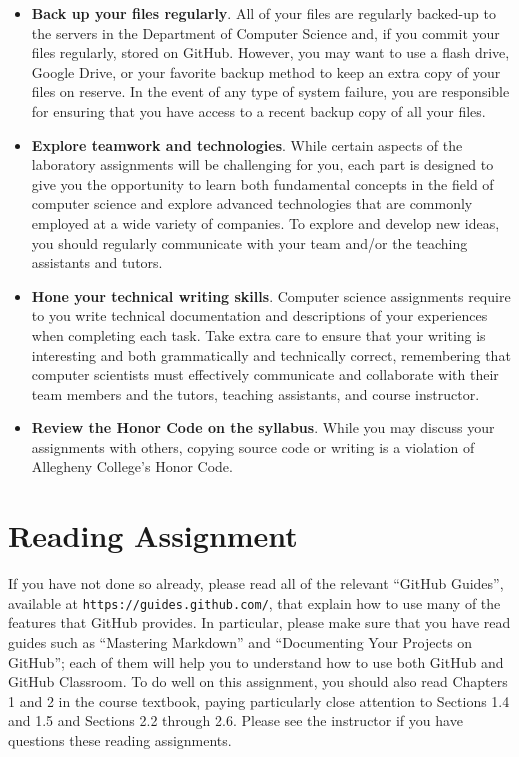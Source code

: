 \documentclass[11pt]{article}
\newcommand{\url}[1]{\lstinline{#1}}
\begin{document}
\begin{itemize}
\item {\bf Back up your files regularly}. All of your files are regularly
  backed-up to the servers in the Department of Computer Science and, if you
  commit your files regularly, stored on GitHub. However, you may want to use a
  flash drive, Google Drive, or your favorite backup method to keep an extra
  copy of your files on reserve. In the event of any type of system failure, you
  are responsible for ensuring that you have access to a recent backup copy of
  all your files.

\item {\bf Explore teamwork and technologies}. While certain aspects of the
  laboratory assignments will be challenging for you, each part is designed to
  give you the opportunity to learn both fundamental concepts in the field of
  computer science and explore advanced technologies that are commonly employed
  at a wide variety of companies. To explore and develop new ideas, you should
  regularly communicate with your team and/or the teaching assistants and
  tutors.

\item {\bf Hone your technical writing skills}. Computer science assignments
  require to you write technical documentation and descriptions of your
  experiences when completing each task. Take extra care to ensure that your
  writing is interesting and both grammatically and technically correct,
  remembering that computer scientists must effectively communicate and
  collaborate with their team members and the tutors, teaching assistants, and
  course instructor.

\item {\bf Review the Honor Code on the syllabus}. While you may discuss your
  assignments with others, copying source code or writing is a violation of
  Allegheny College's Honor Code.

\end{itemize}

\section*{Reading Assignment}

If you have not done so already, please read all of the relevant ``GitHub
Guides'', available at \url{https://guides.github.com/}, that explain how to use
many of the features that GitHub provides. In particular, please make sure that
you have read guides such as ``Mastering Markdown'' and ``Documenting Your
Projects on GitHub''; each of them will help you to understand how to use both
GitHub and GitHub Classroom. To do well on this assignment, you should also read
Chapters 1 and 2 in the course textbook, paying particularly close attention to
Sections 1.4 and 1.5 and Sections 2.2 through 2.6. Please see the instructor if
you have questions these reading assignments.
\end{document}
